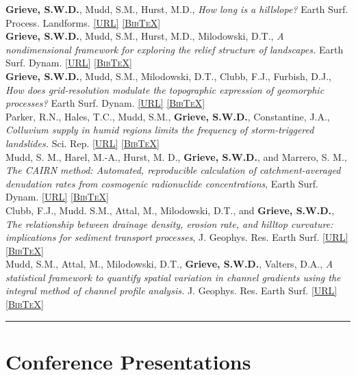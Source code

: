 \documentclass[10pt, a4paper]{article}
\newcommand{\doi}[1]{\href{https://dx.doi.org/#1}{\scriptsize\textsc{[URL]}}}
\newcommand{\bib}[1]{\href{https://www.doi2bib.org/bib/#1}{\scriptsize\textsc{[BibTeX]}}}
\newcommand{\paperlinks}[1]{\doi{#1} \bib{#1}}
\newcommand{\years}[1]{\marginnote{\scriptsize #1}}
\begin{document}
\years{2016}\textbf{Grieve, S.W.D.}, Mudd, S.M., Hurst, M.D., \textit{How long is a hillslope?} Earth Surf. Process. Landforms. \paperlinks{10.1002/esp.3884}\\[0.05cm]

\years{2016}\textbf{Grieve, S.W.D.}, Mudd, S.M., Hurst, M.D., Milodowski, D.T., \textit{A nondimensional framework for exploring the relief structure of landscapes.} Earth Surf. Dynam. \paperlinks{10.5194/esurf-4-309-2016}\\[0.05cm]

\years{2016}\textbf{Grieve, S.W.D.}, Mudd, S.M., Milodowski, D.T., Clubb, F.J., Furbish, D.J., \textit{How does grid-resolution modulate the topographic expression of geomorphic processes?} Earth Surf. Dynam. \paperlinks{10.5194/esurf-4-627-2016}\\[0.05cm]

\years{2016}Parker, R.N., Hales, T.C., Mudd, S.M., \textbf{Grieve, S.W.D.}, Constantine, J.A., \textit{Colluvium supply in humid regions limits the frequency of storm-triggered landslides.} Sci. Rep. \paperlinks{10.1038/srep34438}\\[0.05cm]

\years{2016}Mudd, S. M., Harel, M.-A., Hurst, M. D., \textbf{Grieve, S.W.D.}, and Marrero, S. M., \textit{The CAIRN method: Automated, reproducible calculation of catchment-averaged denudation rates from cosmogenic radionuclide concentrations}, Earth Surf. Dynam. \paperlinks{10.5194/esurf-4-655-2016}\\[0.05cm]

\years{2016}Clubb, F.J., Mudd. S.M., Attal, M., Milodowski, D.T., and \textbf{Grieve, S.W.D.}, \textit{The relationship between drainage density, erosion rate, and hilltop curvature: implications for sediment transport processes}, J. Geophys. Res. Earth Surf. \paperlinks{10.1002/2015JF003747}\\[0.05cm]

\years{2014}Mudd, S.M., Attal, M., Milodowski, D.T., \textbf{Grieve, S.W.D.}, Valters, D.A., \textit{A statistical framework to quantify spatial variation in channel gradients using the integral method of channel profile analysis.} J. Geophys. Res. Earth Surf. \paperlinks{10.1002/2013JF002981}\\[0.05cm]

\hrule
\section*{Conference Presentations}
\end{document}
